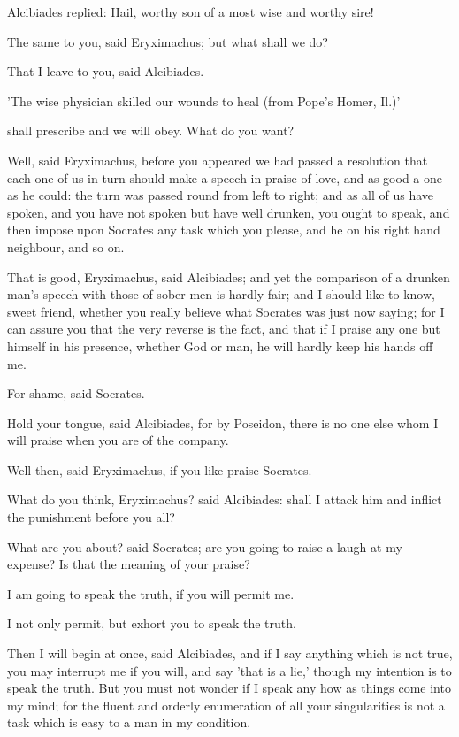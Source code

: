 \para[132] Alcibiades replied: Hail, worthy son of a most wise and worthy sire!

\para[133] The same to you, said Eryximachus; but what shall we do?

\para[134] That I leave to you, said Alcibiades.

\para[135] 'The wise physician skilled our wounds to heal (from Pope's Homer, Il.)'

\para[136] shall prescribe and we will obey. What do you want?

\para[137] Well, said Eryximachus, before you appeared we had passed a resolution that each one of us in turn should make a speech in praise of love, and as good a one as he could: the turn was passed round from left to right; and as all of us have spoken, and you have not spoken but have well drunken, you ought to speak, and then impose upon Socrates any task which you please, and he on his right hand neighbour, and so on.

\para[138] That is good, Eryximachus, said Alcibiades; and yet the comparison of a drunken man's speech with those of sober men is hardly fair; and I should like to know, sweet friend, whether you really believe what Socrates was just now saying; for I can assure you that the very reverse is the fact, and that if I praise any one but himself in his presence, whether God or man, he will hardly keep his hands off me.

\para[139] For shame, said Socrates.

\para[140] Hold your tongue, said Alcibiades, for by Poseidon, there is no one else whom I will praise when you are of the company.

\para[141] Well then, said Eryximachus, if you like praise Socrates.

\para[142] What do you think, Eryximachus? said Alcibiades: shall I attack him and inflict the punishment before you all?

\para[143] What are you about? said Socrates; are you going to raise a laugh at my expense? Is that the meaning of your praise?

\para[144] I am going to speak the truth, if you will permit me.

\para[145] I not only permit, but exhort you to speak the truth.

\para[146] Then I will begin at once, said Alcibiades, and if I say anything which is not true, you may interrupt me if you will, and say 'that is a lie,' though my intention is to speak the truth. But you must not wonder if I speak any how as things come into my mind; for the fluent and orderly enumeration of all your singularities is not a task which is easy to a man in my condition.

